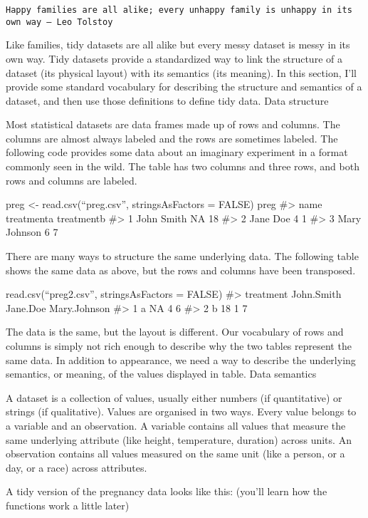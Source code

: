\documentclass[]{article}
\begin{document}
\begin{verbatim}
Happy families are all alike; every unhappy family is unhappy in its own way — Leo Tolstoy
\end{verbatim}

Like families, tidy datasets are all alike but every messy dataset is
messy in its own way. Tidy datasets provide a standardized way to link
the structure of a dataset (its physical layout) with its semantics (its
meaning). In this section, I'll provide some standard vocabulary for
describing the structure and semantics of a dataset, and then use those
definitions to define tidy data. Data structure

Most statistical datasets are data frames made up of rows and columns.
The columns are almost always labeled and the rows are sometimes
labeled. The following code provides some data about an imaginary
experiment in a format commonly seen in the wild. The table has two
columns and three rows, and both rows and columns are labeled.

preg \textless{}- read.csv(``preg.csv'', stringsAsFactors = FALSE) preg
\#\textgreater{} name treatmenta treatmentb \#\textgreater{} 1 John
Smith NA 18 \#\textgreater{} 2 Jane Doe 4 1 \#\textgreater{} 3 Mary
Johnson 6 7

There are many ways to structure the same underlying data. The following
table shows the same data as above, but the rows and columns have been
transposed.

read.csv(``preg2.csv'', stringsAsFactors = FALSE) \#\textgreater{}
treatment John.Smith Jane.Doe Mary.Johnson \#\textgreater{} 1 a NA 4 6
\#\textgreater{} 2 b 18 1 7

The data is the same, but the layout is different. Our vocabulary of
rows and columns is simply not rich enough to describe why the two
tables represent the same data. In addition to appearance, we need a way
to describe the underlying semantics, or meaning, of the values
displayed in table. Data semantics

A dataset is a collection of values, usually either numbers (if
quantitative) or strings (if qualitative). Values are organised in two
ways. Every value belongs to a variable and an observation. A variable
contains all values that measure the same underlying attribute (like
height, temperature, duration) across units. An observation contains all
values measured on the same unit (like a person, or a day, or a race)
across attributes.

A tidy version of the pregnancy data looks like this: (you'll learn how
the functions work a little later)
\end{document}
